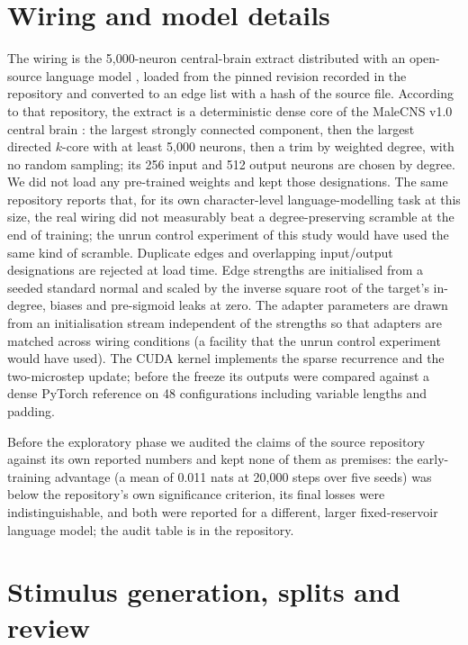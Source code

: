 \documentclass[preprint,12pt,authoryear]{elsarticle}
\begin{document}
\appendix

\section{Wiring and model details}
\label{app:wiring}

The wiring is the 5{,}000-neuron central-brain extract distributed with an open-source language model \citep{flygpt}, loaded from the pinned revision recorded in the repository and converted to an edge list with a hash of the source file. According to that repository, the extract is a deterministic dense core of the MaleCNS v1.0 central brain \citep{berg2026malecns,hartford2026malecns}: the largest strongly connected component, then the largest directed $k$-core with at least 5{,}000 neurons, then a trim by weighted degree, with no random sampling; its 256 input and 512 output neurons are chosen by degree. We did not load any pre-trained weights and kept those designations. The same repository reports that, for its own character-level language-modelling task at this size, the real wiring did not measurably beat a degree-preserving scramble at the end of training; the unrun control experiment of this study would have used the same kind of scramble. Duplicate edges and overlapping input/output designations are rejected at load time. Edge strengths are initialised from a seeded standard normal and scaled by the inverse square root of the target's in-degree, biases and pre-sigmoid leaks at zero. The adapter parameters are drawn from an initialisation stream independent of the strengths so that adapters are matched across wiring conditions (a facility that the unrun control experiment would have used). The CUDA kernel implements the sparse recurrence and the two-microstep update; before the freeze its outputs were compared against a dense PyTorch reference on 48 configurations including variable lengths and padding.

Before the exploratory phase we audited the claims of the source repository against its own reported numbers and kept none of them as premises: the early-training advantage (a mean of 0.011 nats at 20{,}000 steps over five seeds) was below the repository's own significance criterion, its final losses were indistinguishable, and both were reported for a different, larger fixed-reservoir language model; the audit table is in the repository.

\section{Stimulus generation, splits and review}
\label{app:stimuli}
\end{document}
